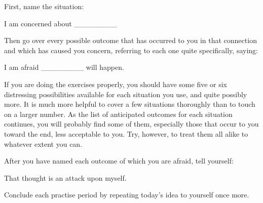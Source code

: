 First, name the situation:

I am concerned about \_\_\_\_\_\_\_\_

Then go over every possible outcome that has occurred to you in that connection and which has caused you concern, referring to each one quite specifically, saying:

I am afraid \_\_\_\_\_\_\_\_ will happen.

If you are doing the exercises properly, you should have some five or six distressing possibilities available for each situation you use, and quite possibly more. It is much more helpful to cover a few situations thoroughly than to touch on a larger number. As the list of anticipated outcomes for each situation continues, you will probably find some of them, especially those that occur to you toward the end, less acceptable to you. Try, however, to treat them all alike to whatever extent you can.

After you have named each outcome of which you are afraid, tell yourself:

That thought is an attack upon myself.

Conclude each practise period by repeating today's idea to yourself once more.


